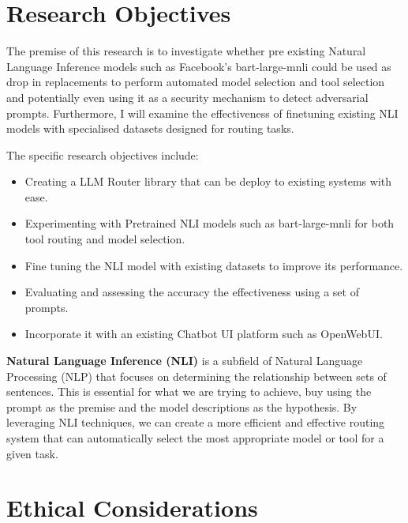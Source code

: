 \section{Research Objectives}
\label{sec:intro_aims_obj}

The premise of this research is to investigate whether pre existing Natural Language Inference models such as Facebook's bart-large-mnli could be used as drop in replacements to perform automated model selection and tool selection and potentially even using it as a security mechanism to detect adversarial prompts. Furthermore, I will examine the effectiveness of finetuning existing NLI models with specialised datasets designed for routing tasks.

The specific research objectives include:
\begin{itemize}
    \item Creating a LLM Router library that can be deploy to existing systems with ease.
    \item Experimenting with Pretrained NLI models such as bart-large-mnli for both tool routing and model selection.
    \item Fine tuning the NLI model with existing datasets to improve its performance.
    \item Evaluating and assessing the accuracy the effectiveness using a set of prompts.
    \item Incorporate it with an existing Chatbot UI platform such as OpenWebUI.
\end{itemize}


\textbf{Natural Language Inference (NLI)} is a subfield of Natural Language Processing (NLP) that focuses on determining the relationship between sets of sentences. This is essential for what we are trying to achieve, buy using the prompt as the premise and the model descriptions as the hypothesis. By leveraging NLI techniques, we can create a more efficient and effective routing system that can automatically select the most appropriate model or tool for a given task.


\newpage
\section{Ethical Considerations}
\label{sec:discussion-ethical-considerations}


